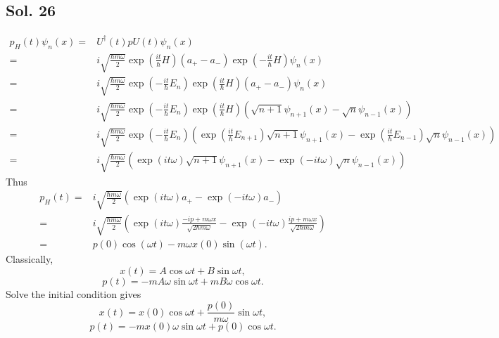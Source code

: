 \subsection*{Sol. 26}
\begin{align*}
    p_H(t)\psi_n(x)
    =&U^\dagger(t) p U(t)\psi_n(x)\\
    =&i\sqrt{\frac{\hbar m\omega}{2}}\exp(\frac{it}{\hbar}H)(a_+-a_-)
    \exp(-\frac{it}{\hbar}H)\psi_n(x)
    \\
    =&
    i\sqrt{\frac{\hbar m\omega}{2}}
    \exp(-\frac{it}{\hbar}E_n)
    \exp(\frac{it}{\hbar}H)(a_+-a_-)
    \psi_n(x)\\
    =&
    i\sqrt{\frac{\hbar m\omega}{2}}
    \exp(-\frac{it}{\hbar}E_n)
    \exp(\frac{it}{\hbar}H)(\sqrt{n+1}\psi_{n+1}(x)
    -\sqrt{n}\psi_{n-1}(x))\\
    =&
    i\sqrt{\frac{\hbar m\omega}{2}}
    \exp(-\frac{it}{\hbar}E_n)
    (\exp(\frac{it}{\hbar}E_{n+1})\sqrt{n+1}\psi_{n+1}(x)
    -\exp(\frac{it}{\hbar}E_{n-1})\sqrt{n}\psi_{n-1}(x))\\
    =&
    i\sqrt{\frac{\hbar m\omega}{2}}
    (\exp(it\omega)\sqrt{n+1}\psi_{n+1}(x)
    -\exp(-it\omega)\sqrt{n}\psi_{n-1}(x))
\end{align*}
Thus 
\begin{align*}
    p_H(t)=&
    i\sqrt{\frac{\hbar m\omega}{2}}
    (\exp(it\omega)a_+
    -\exp(-it\omega)a_-)\\
    =&
    i\sqrt{\frac{\hbar m\omega}{2}}
    (\exp(it\omega)\frac{-ip+m\omega x}{\sqrt{2\hbar m\omega}}
    -\exp(-it\omega)\frac{ip+m\omega x}{\sqrt{2\hbar m\omega}})\\
    =&p(0)\cos(\omega t)-m\omega x(0)\sin(\omega t).
\end{align*}
Classically, 
$$
x(t) = A\cos\omega t + B\sin\omega t,
$$
$$
p(t) = -mA\omega \sin\omega t + mB\omega \cos\omega t.
$$
Solve the initial condition gives
$$
x(t) = x(0)\cos\omega t + \frac{p(0)}{m\omega}\sin\omega t,
$$
$$
p(t) = -mx(0)\omega \sin\omega t + p(0) \cos\omega t.
$$

